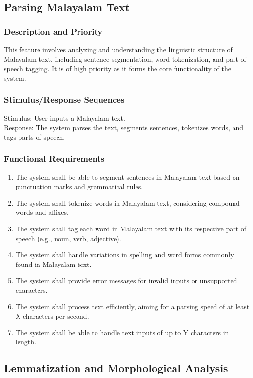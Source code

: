 \documentclass[12pt]{article}
\begin{document}
	\subsection{Parsing Malayalam Text}
	\subsubsection{Description and Priority}
	This feature involves analyzing and understanding the linguistic structure of Malayalam
	text, including sentence segmentation, word tokenization, and part-of-speech tagging. It is
	of high priority as it forms the core functionality of the system.
	
	\subsubsection{Stimulus/Response Sequences}
	Stimulus: User inputs a Malayalam text.\\
	Response: The system parses the text, segments sentences, tokenizes words, and
	tags parts of speech.
	
	\subsubsection{Functional Requirements}
	\begin{enumerate}
		\item The system shall be able to segment sentences in Malayalam text based on
		punctuation marks and grammatical rules.
		\item The system shall tokenize words in Malayalam text, considering compound words
		and affixes.
		\item The system shall tag each word in Malayalam text with its respective part of
		speech (e.g., noun, verb, adjective).
		\item The system shall handle variations in spelling and word forms commonly found in
		Malayalam text.
		\item The system shall provide error messages for invalid inputs or unsupported
		characters.
		\item The system shall process text efficiently, aiming for a parsing speed of at least X
		characters per second.
		\item The system shall be able to handle text inputs of up to Y characters in length.
	\end{enumerate}
	
	\subsection{Lemmatization and Morphological Analysis}
	
\end{document}
